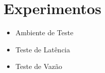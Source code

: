 \section{Experimentos}

\begin{frame}{}
	\begin{itemize}
		\item Ambiente de Teste
		\item Teste de Latência
		\item Teste de Vazão 
	\end{itemize}
\end{frame}